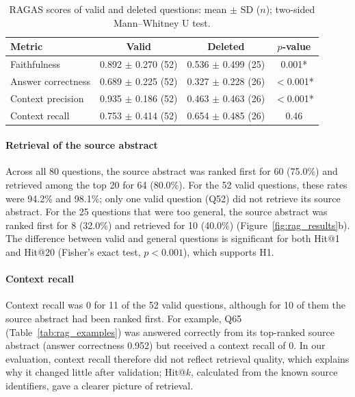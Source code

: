 \documentclass[bdcc,article,submit,pdftex,moreauthors]{Definitions/mdpi}
\begin{document}
\begin{table}[H]
\centering
\caption{RAGAS scores of valid and deleted questions: mean $\pm$ SD ($n$); two-sided Mann--Whitney U test.}
\label{tab:rag_kept_deleted}
\footnotesize
\begin{tabularx}{\textwidth}{X c c c}
\toprule
\textbf{Metric} & \textbf{Valid} & \textbf{Deleted} & \textbf{$p$-value} \\
\midrule
Faithfulness & 0.892 $\pm$ 0.270 (52) & 0.536 $\pm$ 0.499 (25) & 0.001* \\
Answer correctness & 0.689 $\pm$ 0.225 (52) & 0.327 $\pm$ 0.228 (26) & $<$0.001* \\
Context precision & 0.935 $\pm$ 0.186 (52) & 0.463 $\pm$ 0.463 (26) & $<$0.001* \\
Context recall & 0.753 $\pm$ 0.414 (52) & 0.654 $\pm$ 0.485 (26) & 0.46 \\
\bottomrule
\end{tabularx}
\end{table}

\paragraph{Retrieval of the source abstract}
Across all 80 questions, the source abstract was ranked first for 60 (75.0\%) and retrieved among the top 20 for 64 (80.0\%). For the 52 valid questions, these rates were 94.2\% and 98.1\%; only one valid question (Q52) did not retrieve its source abstract. For the 25 questions that were too general, the source abstract was ranked first for 8 (32.0\%) and retrieved for 10 (40.0\%) (Figure~\ref{fig:rag_results}b). The difference between valid and general questions is significant for both Hit@1 and Hit@20 (Fisher's exact test, $p < 0.001$), which supports H1.

\paragraph{Context recall}
Context recall was 0 for 11 of the 52 valid questions, although for 10 of them the source abstract had been ranked first. For example, Q65 (Table~\ref{tab:rag_examples}) was answered correctly from its top-ranked source abstract (answer correctness 0.952) but received a context recall of 0. In our evaluation, context recall therefore did not reflect retrieval quality, which explains why it changed little after validation; Hit@$k$, calculated from the known source identifiers, gave a clearer picture of retrieval.
\end{document}
